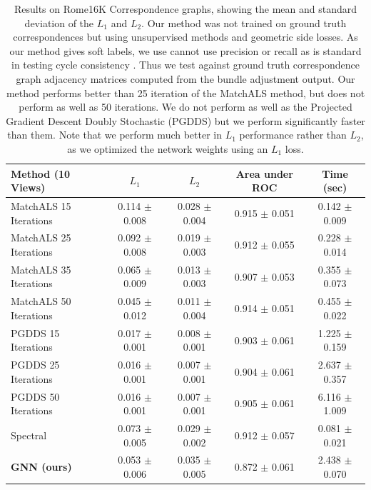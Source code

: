 \documentclass[10pt,twocolumn,letterpaper]{article}
\begin{document}
\begin{table}
\begin{center}
\begin{tabular}{|l|c|c|c|c|}
\hline\hline
Method (10 Views)                                   & $L_1$             & $L_2$             & Area under ROC    & Time (sec)        \\
\hline\hline
MatchALS \cite{zhou2015multi} 15 Iterations         & 0.114 $\pm$ 0.008 & 0.028 $\pm$ 0.004 & 0.915 $\pm$ 0.051 & 0.142 $\pm$ 0.009 \\ \hline
MatchALS \cite{zhou2015multi} 25 Iterations         & 0.092 $\pm$ 0.008 & 0.019 $\pm$ 0.003 & 0.912 $\pm$ 0.055 & 0.228 $\pm$ 0.014 \\ \hline
MatchALS \cite{zhou2015multi} 35 Iterations         & 0.065 $\pm$ 0.009 & 0.013 $\pm$ 0.003 & 0.907 $\pm$ 0.053 & 0.355 $\pm$ 0.073 \\ \hline
MatchALS \cite{zhou2015multi} 50 Iterations         & 0.045 $\pm$ 0.012 & 0.011 $\pm$ 0.004 & 0.914 $\pm$ 0.051 & 0.455 $\pm$ 0.022 \\ \hline
PGDDS \cite{leonardos2016distributed} 15 Iterations & 0.017 $\pm$ 0.001 & 0.008 $\pm$ 0.001 & 0.903 $\pm$ 0.061 & 1.225 $\pm$ 0.159 \\ \hline
PGDDS \cite{leonardos2016distributed} 25 Iterations & 0.016 $\pm$ 0.001 & 0.007 $\pm$ 0.001 & 0.904 $\pm$ 0.061 & 2.637 $\pm$ 0.357 \\ \hline
PGDDS \cite{leonardos2016distributed} 50 Iterations & 0.016 $\pm$ 0.001 & 0.007 $\pm$ 0.001 & 0.905 $\pm$ 0.061 & 6.116 $\pm$ 1.009 \\ \hline
Spectral \cite{pachauri2013solving}                 & 0.073 $\pm$ 0.005 & 0.029 $\pm$ 0.002 & 0.912 $\pm$ 0.057 & 0.081 $\pm$ 0.021 \\ \hline
\textbf{GNN (ours)}                                 & 0.053 $\pm$ 0.006 & 0.035 $\pm$ 0.005 & 0.872 $\pm$ 0.061 & 2.438 $\pm$ 0.070 \\ \hline

\end{tabular}
\end{center}

\caption{
Results on Rome16K Correspondence graphs, showing the mean and standard deviation of the $L_1$ and $L_2$.
Our method was not trained on ground truth correspondences but using unsupervised methods and geometric side losses.
As our method gives soft labels, we use cannot use precision or recall as is standard in testing cycle consistency \cite{zhou2015multi}.
Thus we test against ground truth correspondence graph adjacency matrices computed from the bundle adjustment output.
Our method performs better than 25 iteration of the MatchALS \cite{zhou2015multi} method, but does not perform as well as 50 iterations.
We do not perform as well as the Projected Gradient Descent Doubly Stochastic (PGDDS) \cite{leonardos2016distributed} but we perform significantly faster than them.
Note that we perform much better in $L_1$ performance rather than $L_2$, as we optimized the network weights using an $L_1$ loss.
}
\label{tab:rome16ktab}
\end{table}
\end{document}
